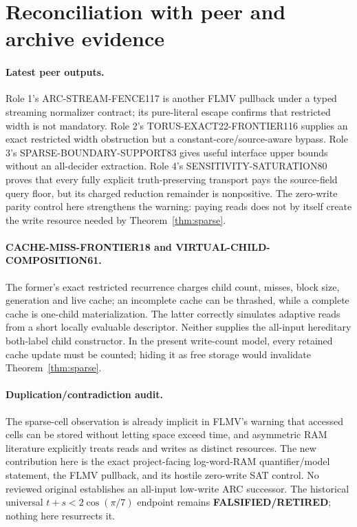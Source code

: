 \documentclass[11pt]{article}
\begin{document}
\section{Reconciliation with peer and archive evidence}
\paragraph{Latest peer outputs.}
Role 1's ARC-STREAM-FENCE117 is another FLMV pullback under a typed streaming
normalizer contract; its pure-literal escape confirms that restricted width
is not mandatory.  Role 2's TORUS-EXACT22-FRONTIER116 supplies an exact
restricted width obstruction but a constant-core/source-aware bypass.  Role
3's SPARSE-BOUNDARY-SUPPORT83 gives useful interface upper bounds without an
all-decider extraction.  Role 4's SENSITIVITY-SATURATION80 proves that every
fully explicit truth-preserving transport pays the source-field query floor,
but its charged reduction remainder is nonpositive.  The zero-write parity
control here strengthens the warning: paying reads does not by itself create
the write resource needed by Theorem~\ref{thm:sparse}.

\paragraph{CACHE-MISS-FRONTIER18 and VIRTUAL-CHILD-COMPOSITION61.}
The former's exact restricted recurrence charges child count, misses, block
size, generation and live cache; an incomplete cache can be thrashed, while a
complete cache is one-child materialization.  The latter correctly simulates
adaptive reads from a short locally evaluable descriptor.  Neither supplies
the all-input hereditary both-label child constructor.  In the present
write-count model, every retained cache update must be counted; hiding it as
free storage would invalidate Theorem~\ref{thm:sparse}.

\paragraph{Duplication/contradiction audit.}
The sparse-cell observation is already implicit in FLMV's warning that
accessed cells can be stored without letting space exceed time, and
asymmetric RAM literature explicitly treats reads and writes as distinct
resources.  The new contribution here is the exact project-facing
log-word-RAM quantifier/model statement, the FLMV pullback, and its hostile
zero-write SAT control.  No reviewed original establishes an all-input
low-write ARC successor.  The historical universal
$t+s<2\cos(\pi/7)$ endpoint remains \textbf{FALSIFIED/RETIRED}; nothing here
resurrects it.
\end{document}
